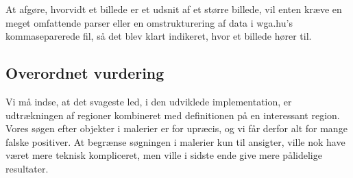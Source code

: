 {At afgøre, hvorvidt et billede er et udsnit af et større billede, vil
enten kræve en meget omfattende parser eller en omstrukturering af data
i wga.hu's kommaseparerede fil, så det blev klart indikeret, hvor et
billede hører til.

\subsection{Overordnet vurdering}
Vi må indse, at det svageste led, i den udviklede implementation, er
udtrækningen af regioner kombineret med definitionen på en interessant
region. Vores søgen efter objekter i malerier er for upræcis, og vi får
derfor alt for mange falske positiver. At begrænse søgningen i malerier
kun til ansigter, ville nok have været mere teknisk kompliceret, men
ville i sidste ende give mere pålidelige resultater.

}

